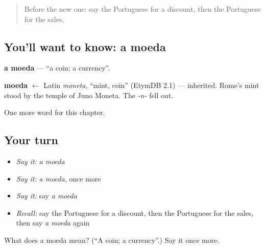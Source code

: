 \begin{quote}
Before the new one: say the Portuguese for a discount, then the Portuguese for the sales.
\end{quote}

\subsection*{You'll want to know: a moeda}
\textbf{a moeda} — \textquotedblleft{}a coin; a currency\textquotedblright{}.

\begin{cousinweb}
\textbf{moeda} $\leftarrow$ Latin \emph{moneta}, \textquotedblleft{}mint, coin\textquotedblright{} (EtymDB 2.1) — inherited. Rome's mint stood by the temple of Juno Moneta. The \emph{-n-} fell out.
\end{cousinweb}

\begin{grammarlens}[title={What you've built}]
One more word for this chapter.
\end{grammarlens}

\subsection*{Your turn}
\begin{itemize}
\raggedright
  \item \emph{Say it:} \emph{a moeda}
  \item \emph{Say it:} \emph{a moeda}, once more
  \item \emph{Say it:} say \emph{a moeda}
  \item \emph{Recall:} say the Portuguese for a discount, then the Portuguese for the sales, then say \emph{a moeda} again
\end{itemize}

\begin{tcolorbox}[breakable,colback=teal!4,colframe=teal!35!black,title={Before you move on}]
What does a moeda mean? (\textquotedblleft{}A coin; a currency\textquotedblright{}.) Say it once more.
\end{tcolorbox}
